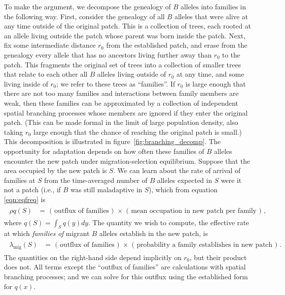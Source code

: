 \documentclass{article}
\newcommand{\migrate}{\lambda_\text{mig}}
\begin{document}
To make the argument, we decompose the genealogy of $B$ alleles into families in the following way.
First, consider the genealogy of all $B$ alleles that were alive at any time outside of the original patch.  
This is a collection of trees, each rooted at an allele living outside the patch whose parent was born inside the patch.
Next, fix some intermediate distance $r_0$ from the established patch,
and erase from the genealogy every allele that has no ancestors living further away than $r_0$ to the patch.
This fragments the original set of trees into a collection of smaller trees that relate to each other all $B$ alleles living outside of $r_0$ at any time,
and some living inside of $r_0$;
we refer to these trees as ``families''.
If $r_0$ is large enough that there are not too many families
and interactions between family members are weak,
then these families can be approximated 
by a collection of independent spatial branching processes
whose members are ignored if they enter the original patch.
(This can be made formal in the limit of large population density, also taking $r_0$ large enough that the chance of reaching the original patch is small.)
This decomposition is illustrated in figure~\ref{fig:branching_decomp}.
The opportunity for adaptation depends on how often these families of $B$ alleles encounter the new patch under
migration-selection equilibrium.
Suppose that the area occupied by the new patch is $S$.
We can learn about the rate of arrival of families at $S$ from
the time-averaged number of $B$ alleles expected in $S$ were it not a patch
(i.e., if $B$ was still maladaptive in $S$),
which from equation \eqref{eqn:eqfreq}
is 
\begin{align}
    \label{eqn:gestalt_q}
    \begin{split}
        \rho q(S) &= \text{ ( outflux of families ) } \times \text{ ( mean occupation in new patch per family ) } ,
\end{split}
\end{align}
where $q(S) = \int_S q(y) dy$.
The quantity we wish to compute,
the effective rate at which \emph{families of} migrant $B$ alleles establish in the new patch,
is
\begin{align}
    \label{eqn:gestalt_migrate}
    \begin{split}
        \migrate(S) &= \text{ ( outflux of families ) } \times \text{ ( probability a family establishes in new patch ) } .
    \end{split}
\end{align}
The quantities on the right-hand side depend implicitly on $r_0$,
but their product does not.
All terms except the ``outflux of families'' are calculations with spatial branching processes;
and we can solve for this outflux using the established form for $q(x)$.
\end{document}
